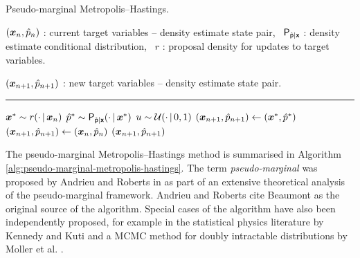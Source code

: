 \begin{algorithm}[!t]
\caption{Pseudo-marginal Metropolis--Hastings.}
\label{alg:pseudo-marginal-metropolis-hastings}
\begin{algorithmic}
\small
    \Require
    $(\boldsymbol{x}_n, \hat{p}_n)$ : current target variables -- density estimate state pair,~
    $\mathsf{P}_{\hat{\mathsf{p}}|\boldsymbol{\mathsf{x}}}$ : density estimate conditional distribution,~
    $r$ : proposal density for updates to target variables.
    \Ensure\raggedright
    $(\boldsymbol{x}_{n+1}, \hat{p}_{n+1})$ : new target variables -- density estimate state pair.
\end{algorithmic}
\hrule
\small
\begin{algorithmic}[1]
  \State $\boldsymbol{x}^* \sim r(\cdot \operatorname{|} \boldsymbol{x}_n)$ 
  \State $\hat{p}^* \sim \mathsf{P}_{\hat{\mathsf{p}}|\boldsymbol{\mathsf{x}}}(\cdot\operatorname{|}\boldsymbol{x}^*)$ \label{ln:density-estimate} 
  \State $u \sim \mathcal{U}(\cdot \operatorname{|} 0,1)$
    \State $(\boldsymbol{x}_{n+1},\hat{p}_{n+1}) \gets (\boldsymbol{x}^*,\hat{p}^*)$ 
  \Else
    \State  $ (\boldsymbol{x}_{n+1},\hat{p}_{n+1}) \gets (\boldsymbol{x}_n,\hat{p}_n)$ 
  \EndIf
  \State \Return $(\boldsymbol{x}_{n+1},\hat{p}_{n+1})$
\end{algorithmic}
\end{algorithm}

The pseudo-marginal Metropolis--Hastings method is summarised in Algorithm \ref{alg:pseudo-marginal-metropolis-hastings}. The term \emph{pseudo-marginal} was proposed by Andrieu and Roberts in \citep{andrieu2009pseudo} as part of an extensive theoretical analysis of the pseudo-marginal framework. Andrieu and Roberts cite Beaumont \citep{beaumont2003estimation} as the original source of the algorithm. Special cases of the algorithm have also been independently proposed, for example in the statistical physics literature by Kennedy and Kuti \citep{kennedy1985noise} and a \ac{MCMC} method for doubly intractable distributions by Moller et al. \citep{moller2006efficient}.

